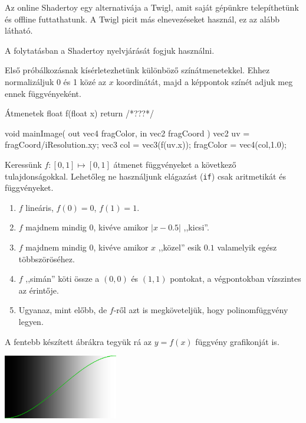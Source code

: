 Az online Shadertoy egy alternativája a Twigl, amit saját gépünkre telepíthetünk és offline futtathatunk.
A Twigl picit más elnevezéseket használ, ez az alább látható.

  
A folytatásban a Shadertoy nyelvjárását fogjuk használni. 

\matfeladatok

Első próbálkozásnak kísérletezhetünk különböző színátmenetekkel. Ehhez normalizáljuk 0 és 1 közé
az $x$ koordinátát, majd a képpontok színét adjuk meg ennek függvényeként.

\begin{glsl}{Átmenetek}
float f(float x) { return /*???*/ }
    
void mainImage( out vec4 fragColor, in vec2 fragCoord )
{
  vec2 uv = fragCoord/iResolution.xy;
  vec3 col = vec3(f(uv.x));
  fragColor = vec4(col,1.0);
}
\end{glsl}

Keressünk $f: [0, 1] \mapsto [0,1]$ átmenet függvényeket a következő tulajdonságokkal.
Lehetőleg ne használjunk elágazást (\texttt{if}) csak aritmetikát és függvényeket.

\begin{enumerate}
  \item $f$ lineáris, $f(0)=0$, $f(1)=1$.
  \item $f$ majdnem mindig 0, kivéve amikor $|x-0.5|$ ,,kicsi''.
  \item $f$ majdnem mindig 0, kivéve amikor $x$ ,,közel'' esik $0.1$ valamelyik egész többszöröséhez.
  \item $f$ ,,simán'' köti össze a $(0,0)$ és $(1,1)$ pontokat, a végpontokban vízszintes az érintője.
  \item Ugyanaz, mint előbb, de $f$-ről azt is megköveteljük, hogy polinomfüggvény legyen. 
\end{enumerate}

A fentebb készített ábrákra tegyük rá az $y=f(x)$ függvény grafikonját is.

\includegraphics[width=5cm]{images/fv.png}


